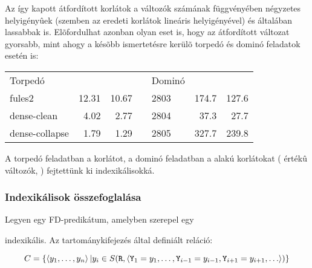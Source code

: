 Az így kapott átfordított korlátok a változók számának függvényében négyzetes
helyigényûek (szemben az eredeti korlátok lineáris helyigényével) és általában lassabbak
is. Elõfordulhat azonban olyan eset is, hogy az átfordított változat gyorsabb, mint
ahogy a késõbb ismertetésre kerülõ torpedó és dominó feladatok esetén is:

\br

\begin{center}\begin{tabular}{|l|r|r|c|l|r|r|}
\cline{1-3}\cline{5-7}
Torpedó        & \cd{:-} & \cd{+:} & \hspace{0.5cm} & Dominó & \cd{:-} & \cd{+:} \\
\cline{1-3}\cline{5-7}
fules2         & 12.31   & 10.67   & \hspace{0.5cm} &   2803 &   174.7 & 127.6 \\
dense-clean    &  4.02   &  2.77   & \hspace{0.5cm} &   2804 &    37.3 &  27.7 \\
dense-collapse &  1.79   &  1.29   & \hspace{0.5cm} &   2805 &   327.7 & 239.8 \\
\cline{1-3}\cline{5-7}
\end{tabular}\end{center}
\br

A torpedó feladatban a  korlátot, a dominó feladatban a
 alakú korlátokat ( értékû változók, )
fejtettünk ki indexikálisokká.

\subsubsection{Indexikálisok összefoglalása}

Legyen  egy FD-predikátum, amelyben szerepel egy
\begin{center}
\end{center}
indexikális. Az  tartománykifejezés által definiált reláció:

\[ C = \{ \left\langle y_1, \ldots, y_n\right\rangle |  y_i \in S(\texttt{R},\left\langle{\tt
Y}_1=y_1,
 \ldots, \texttt{Y}_{i-1}=y_{i-1}, \texttt{Y}_{i+1}=y_{i+1},  \ldots \right\rangle)\}\]


